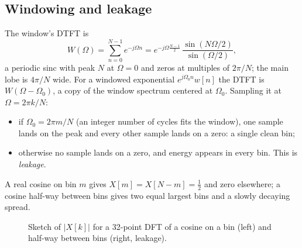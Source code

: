 \documentclass[11pt]{article}
\numberwithin{equation}{section}
\theoremstyle{definition}
\theoremstyle{remark}
\begin{document}
\subsection{Windowing and leakage}
The window's DTFT is
\begin{equation}
W(\Omega)=\sum_{n=0}^{N-1}e^{-j\Omega n}=e^{-j\Omega\frac{N-1}{2}}\,\frac{\sin(N\Omega/2)}{\sin(\Omega/2)},
\end{equation}
a periodic sinc with peak $N$ at $\Omega=0$ and zeros at multiples of $2\pi/N$; the main lobe is
$4\pi/N$ wide. For a windowed exponential $e^{j\Omega_0n}w[n]$ the DTFT is $W(\Omega-\Omega_0)$, a copy of
the window spectrum centered at $\Omega_0$. Sampling it at $\Omega=2\pi k/N$:
\begin{itemize}
\item if $\Omega_0=2\pi m/N$ (an integer number of cycles fits the window), one sample lands on the
peak and every other sample lands on a zero: a single clean bin;
\item otherwise no sample lands on a zero, and energy appears in every bin. This is \emph{leakage}.
\end{itemize}
A real cosine on bin $m$ gives $X[m]=X[N-m]=\frac12$ and zero elsewhere; a cosine half-way between
bins gives two equal largest bins and a slowly decaying spread.

\begin{figure}[h]
\centering
{}
\caption{Sketch of $|X[k]|$ for a 32-point DFT of a cosine on a bin (left) and half-way between
bins (right, leakage).}
\end{figure}
\end{document}
